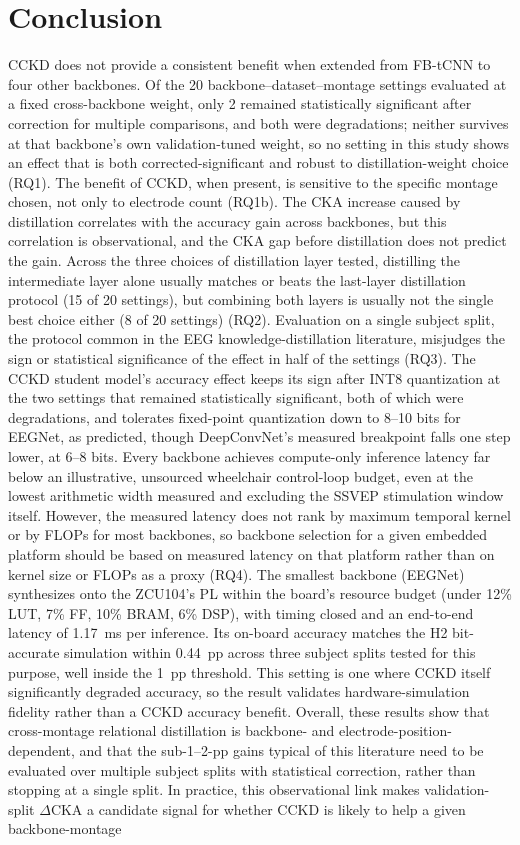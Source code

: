 \documentclass[11pt,a4paper,twoside,asymmetric]{article}
\begin{document}
\section{Conclusion}

CCKD does not provide a consistent benefit when extended from FB-tCNN to four other backbones. Of the 20 backbone--dataset--montage settings evaluated at a fixed cross-backbone weight, only 2 remained statistically significant after correction for multiple comparisons, and both were degradations; neither survives at that backbone's own validation-tuned weight, so no setting in this study shows an effect that is both corrected-significant and robust to distillation-weight choice (RQ1). The benefit of CCKD, when present, is sensitive to the specific montage chosen, not only to electrode count (RQ1b). The CKA increase caused by distillation correlates with the accuracy gain across backbones, but this correlation is observational, and the CKA gap before distillation does not predict the gain. Across the three choices of distillation layer tested, distilling the intermediate layer alone usually matches or beats the last-layer distillation protocol \cite{R82} (15 of 20 settings), but combining both layers is usually not the single best choice either (8 of 20 settings) (RQ2). Evaluation on a single subject split, the protocol common in the EEG knowledge-distillation literature, misjudges the sign or statistical significance of the effect in half of the settings (RQ3). The CCKD student model's accuracy effect keeps its sign after INT8 quantization at the two settings that remained statistically significant, both of which were degradations, and tolerates fixed-point quantization down to 8--10 bits for EEGNet, as predicted, though DeepConvNet's measured breakpoint falls one step lower, at 6--8 bits. Every backbone achieves compute-only inference latency far below an illustrative, unsourced wheelchair control-loop budget, even at the lowest arithmetic width measured and excluding the SSVEP stimulation window itself. However, the measured latency does not rank by maximum temporal kernel or by FLOPs for most backbones, so backbone selection for a given embedded platform should be based on measured latency on that platform rather than on kernel size or FLOPs as a proxy (RQ4). The smallest backbone (EEGNet) synthesizes onto the ZCU104's PL within the board's resource budget (under 12\% LUT, 7\% FF, 10\% BRAM, 6\% DSP), with timing closed and an end-to-end latency of 1.17~ms per inference. Its on-board accuracy matches the H2 bit-accurate simulation within 0.44~pp across three subject splits tested for this purpose, well inside the 1~pp threshold. This setting is one where CCKD itself significantly degraded accuracy, so the result validates hardware-simulation fidelity rather than a CCKD accuracy benefit. Overall, these results show that cross-montage relational distillation is backbone- and electrode-position-dependent, and that the sub-1--2-pp gains typical of this literature need to be evaluated over multiple subject splits with statistical correction, rather than stopping at a single split. In practice, this observational link makes validation-split $\Delta$CKA a candidate signal for whether CCKD is likely to help a given backbone-montage 
\end{document}
